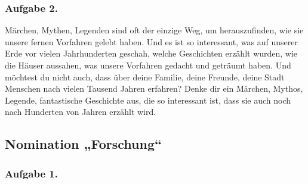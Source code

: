 \documentclass[11pt,a4paper]{article}
\begin{document}
\subsubsection*{Aufgabe 2.}

Märchen, Mythen, Legenden sind oft der einzige Weg, um herauszufinden, wie sie
unsere fernen Vorfahren gelebt haben. Und es ist so interessant, was auf
unserer Erde vor vielen Jahrhunderten geschah, welche Geschichten erzählt
wurden, wie die Häuser aussahen, was unsere Vorfahren gedacht und geträumt
haben. Und möchtest du nicht auch, dass über deine Familie, deine Freunde,
deine Stadt Menschen nach vielen Tausend Jahren erfahren?  Denke dir ein
Märchen, Mythos, Legende, fantastische Geschichte aus, die so interessant ist,
dass sie auch noch nach Hunderten von Jahren erzählt wird.

\subsection{Nomination „Forschung“}

\subsubsection*{Aufgabe 1.}

\newcommand{\AnimalsInCosmos}{Seit den Anfängen der Erforschung des Weltraums
  wurde der Mensch von Tieren begleitet (und manchmal ersetzt). In den mehr
  als 60 Jahren Weltraumforschung sind alle möglichen Arten von Tieren sind im
  Weltraum gewesen. Die interessantesten Experimente im Orbit stehen im
  Zusammenhang mit der Kultivierung von Pflanzen. Es war nicht sofort möglich,
  Bedingungen zu schaffen, unter denen die Pflanzen nicht nur grüne Masse
  ansetzten, sondern auch blühten und Früchte trugen. Hier also das
  Forschungsthema: „Tiere und Pflanzen im Weltraum“.  Du kannst für deine
  Untersuchungen ein spezifischeres Thema wählen.
\begin{itemize}[noitemsep]
\item Katalog „Tiere im Weltraum“. Art der Tiere, Datum des Fluges ins All,
  Dauer des Aufenthalts im Weltraum, Ziele des Experiments, Ergebnisse des
  Experiments.
\item Katalog „Pflanzen im Weltraum“. Art der Pflanze, Datum des Fluges ins
  All, Dauer des Aufenthalts im Weltraum, Ziele des Experiments, Ergebnisse
  des Experiments.
\item Katalog „Geräte zur Aufrechterhaltung der Lebenstätigkeit von Tieren im
  Kosmos“.  Welche Aufgaben standen und wie wurden diese in jedem der Geräte
  gelöst?
\item Katalog „Geräte zur Aufrechterhaltung der Lebensaktivität von Pflanzen
  im Kosmos“.  Welche Aufgaben standen und wie wurden diese in jedem der
  Geräte gelöst?
\item Welche Aufgaben der Anpassung von Tieren und Pflanzen an den Aufenthalt
  im Weltraum sind immer noch ungelöst?  Schlage mögliche Lösungen vor.
\end{itemize}}
\end{document}
